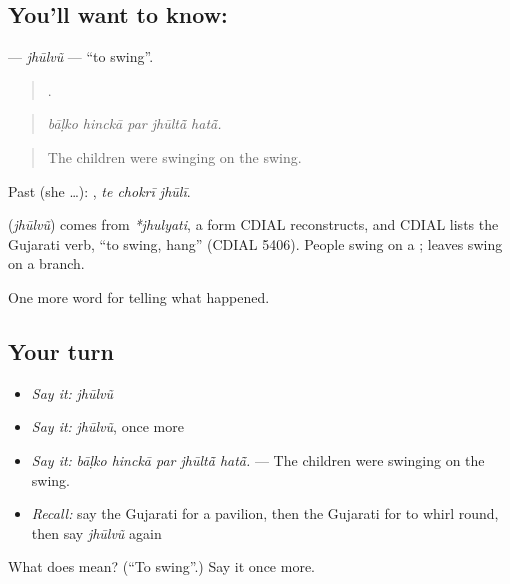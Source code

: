\subsection*{You'll want to know: }
\textbf{} — \emph{jhūlvũ} — \textquotedblleft{}to swing\textquotedblright{}.

\begin{quote}
    .
\end{quote}

\begin{quote}
\emph{bāḷko hinckā par jhūltā̃ hatā̃.}
\end{quote}

\begin{quote}
The children were swinging on the swing.
\end{quote}

Past (she …):   , \emph{te chokrī jhūlī}.

\begin{cousinweb}
\textbf{} (\emph{jhūlvũ}) comes from \emph{*jhulyati}, a form CDIAL reconstructs, and CDIAL lists the Gujarati verb, \textquotedblleft{}to swing, hang\textquotedblright{} (CDIAL 5406). People swing on a \textbf{}; leaves swing on a branch.
\end{cousinweb}

\begin{grammarlens}[title={What you've built}]
One more word for telling what happened.
\end{grammarlens}

\subsection*{Your turn}
\begin{itemize}
\raggedright
  \item \emph{Say it:} \emph{jhūlvũ}
  \item \emph{Say it:} \emph{jhūlvũ}, once more
  \item \emph{Say it:} \emph{bāḷko hinckā par jhūltā̃ hatā̃.} — The children were swinging on the swing.
  \item \emph{Recall:} say the Gujarati for a pavilion, then the Gujarati for to whirl round, then say \emph{jhūlvũ} again
\end{itemize}

\begin{tcolorbox}[breakable,colback=teal!4,colframe=teal!35!black,title={Before you move on}]
What does  mean? (\textquotedblleft{}To swing\textquotedblright{}.) Say it once more.
\end{tcolorbox}

